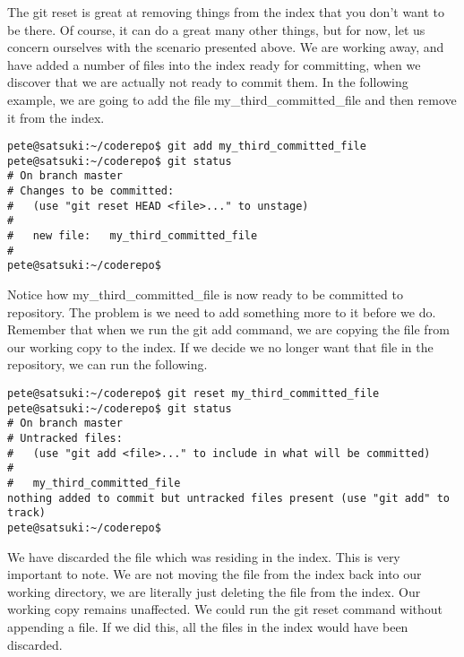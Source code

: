 The git reset is great at removing things from the index that you don't want to be there.  Of course, it can do a great many other things, but for now, let us concern ourselves with the scenario presented above.  We are working away, and have added a number of files into the index ready for committing, when we discover that we are actually not ready to commit them.  In the following example, we are going to add the file my\_third\_committed\_file and then remove it from the index.

\begin{verbatim} 
pete@satsuki:~/coderepo$ git add my_third_committed_file
pete@satsuki:~/coderepo$ git status
# On branch master
# Changes to be committed:
#   (use "git reset HEAD <file>..." to unstage)
#
#	new file:   my_third_committed_file
#
pete@satsuki:~/coderepo$ 
\end{verbatim} 

Notice how my\_third\_committed\_file is now ready to be committed to repository.  The problem is we need to add something more to it before we do.  Remember that when we run the git add command, we are copying the file from our working copy to the index.  If we decide we no longer want that file in the repository, we can run the following.  

\begin{verbatim} 
pete@satsuki:~/coderepo$ git reset my_third_committed_file
pete@satsuki:~/coderepo$ git status
# On branch master
# Untracked files:
#   (use "git add <file>..." to include in what will be committed)
#
#	my_third_committed_file
nothing added to commit but untracked files present (use "git add" to track)
pete@satsuki:~/coderepo$ 
\end{verbatim} 

We have discarded the file which was residing in the index.  This is very important to note.  We are not moving the file from the index back into our working directory, we are literally just deleting the file from the index.  Our working copy remains unaffected.  We could run the git reset command without appending a file.  If we did this, all the files in the index would have been discarded.  

